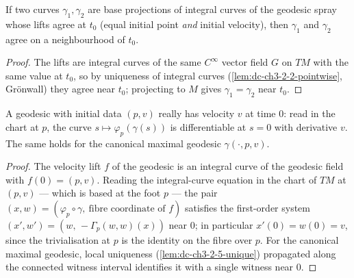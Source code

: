 \begin{lemma}
  \label{lem:dc-ch3-2-5-unique}
  \leanok
  If two curves $\gamma_1,\gamma_2$ are base projections of integral curves of the
  geodesic spray whose lifts agree at $t_0$ (equal initial point \emph{and} initial
  velocity), then $\gamma_1$ and $\gamma_2$ agree on a neighbourhood of $t_0$.
\end{lemma}
\begin{proof}
  \sketch
  \leanok
  The lifts are integral curves of the same $C^\infty$ vector field $G$ on $TM$
  with the same value at $t_0$, so by uniqueness of integral curves
  (\cref{lem:dc-ch3-2-2-pointwise}, Gr\"onwall) they agree near $t_0$; projecting to $M$
  gives $\gamma_1=\gamma_2$ near $t_0$.
\end{proof}

\begin{lemma}
  \label{lem:dc-ch3-2-5-velocity}
  \leanok
  A geodesic with initial data $(p,v)$ really has velocity $v$ at time $0$: read
  in the chart at $p$, the curve $s\mapsto\varphi_p(\gamma(s))$ is differentiable
  at $s=0$ with derivative $v$. The same holds for the canonical maximal
  geodesic $\gamma(\cdot,p,v)$.
\end{lemma}
\begin{proof}
  \sketch
  \leanok
  The velocity lift $f$ of the geodesic is an integral curve of the geodesic
  field with $f(0)=(p,v)$. Reading the integral-curve equation in the chart of
  $TM$ at $(p,v)$ — which is based at the foot $p$ — the pair
  $(x,w)=(\varphi_p\circ\gamma,\ \text{fibre coordinate of }f)$ satisfies the
  first-order system $(x',w')=(w,\,-\Gamma_p(w,w)(x))$ near $0$; in particular
  $x'(0)=w(0)=v$, since the trivialisation at $p$ is the identity on the fibre
  over $p$. For the canonical maximal geodesic, local uniqueness
  (\cref{lem:dc-ch3-2-5-unique}) propagated along the connected witness interval
  identifies it with a single witness near $0$.
\end{proof}

